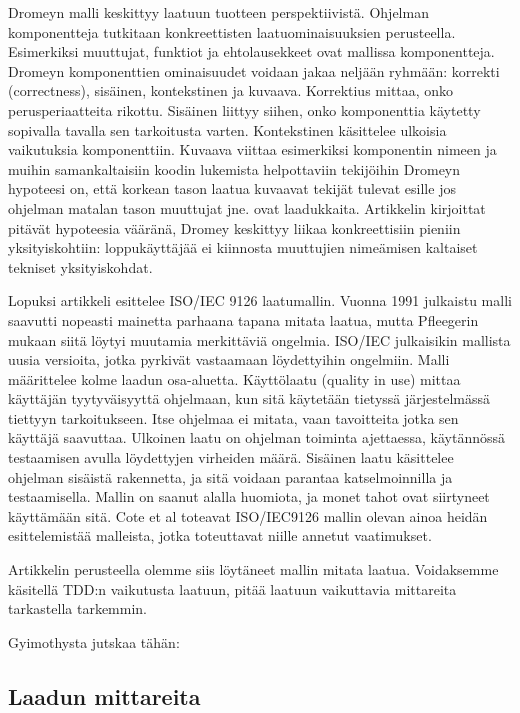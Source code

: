 \documentclass[finnish]{tktltiki2}
\theoremstyle{definition}
\theoremstyle{remark}
\begin{document}
Dromeyn malli keskittyy laatuun tuotteen perspektiivistä. Ohjelman komponentteja tutkitaan konkreettisten laatuominaisuuksien perusteella. Esimerkiksi muuttujat, funktiot ja ehtolausekkeet ovat mallissa komponentteja. Dromeyn komponenttien ominaisuudet voidaan jakaa neljään ryhmään: korrekti (correctness), sisäinen, kontekstinen ja kuvaava. Korrektius mittaa, onko perusperiaatteita rikottu. Sisäinen liittyy siihen, onko komponenttia käytetty sopivalla tavalla sen tarkoitusta varten.
 Kontekstinen käsittelee ulkoisia vaikutuksia komponenttiin. Kuvaava viittaa esimerkiksi komponentin nimeen ja muihin samankaltaisiin koodin lukemista helpottaviin tekijöihin
Dromeyn hypoteesi on, että korkean tason laatua kuvaavat tekijät tulevat esille jos ohjelman matalan tason muuttujat jne. ovat laadukkaita. Artikkelin kirjoittat pitävät hypoteesia vääränä, Dromey keskittyy liikaa konkreettisiin pieniin yksityiskohtiin: loppukäyttäjää ei kiinnosta muuttujien nimeämisen kaltaiset tekniset yksityiskohdat.

Lopuksi artikkeli esittelee ISO/IEC 9126 laatumallin. Vuonna 1991 julkaistu malli saavutti nopeasti mainetta parhaana tapana mitata laatua, mutta Pfleegerin mukaan siitä löytyi muutamia merkittäviä ongelmia. ISO/IEC julkaisikin mallista uusia versioita, jotka pyrkivät vastaamaan löydettyihin ongelmiin. Malli määrittelee kolme laadun osa-aluetta. Käyttölaatu (quality in use) mittaa käyttäjän tyytyväisyyttä ohjelmaan, kun sitä käytetään tietyssä järjestelmässä tiettyyn tarkoitukseen. Itse ohjelmaa ei mitata, vaan tavoitteita jotka sen käyttäjä saavuttaa. Ulkoinen laatu on ohjelman toiminta ajettaessa, käytännössä testaamisen avulla löydettyjen virheiden määrä. Sisäinen laatu käsittelee ohjelman sisäistä rakennetta, ja sitä voidaan parantaa katselmoinnilla ja testaamisella. Mallin on saanut alalla huomiota, ja monet tahot ovat siirtyneet käyttämään sitä. Cote et al toteavat ISO/IEC9126 mallin olevan ainoa heidän esittelemistää malleista, jotka toteuttavat niille annetut vaatimukset. \cite{Cote07}

Artikkelin perusteella olemme siis löytäneet mallin mitata laatua. Voidaksemme käsitellä TDD:n vaikutusta laatuun, pitää laatuun vaikuttavia mittareita tarkastella tarkemmin.







Gyimothysta jutskaa tähän:
\cite{Gyimothy05}

\subsection{Laadun mittareita}
\end{document}
